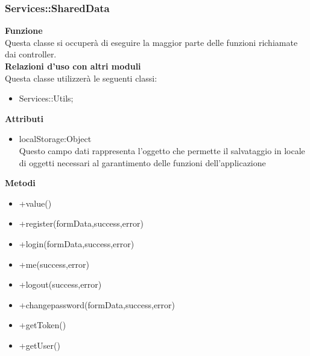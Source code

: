 \subsubsection{Services::SharedData}
		\label{sub:servicesMain}
		\textbf{Funzione}\\
		\indent Questa classe si occuperà di eseguire la maggior parte delle funzioni richiamate dai controller.\\
		\textbf{Relazioni d'uso con altri moduli}\\
		\indent Questa classe utilizzerà le seguenti classi:
		\begin{itemize}
		\item Services::Utils;
		\end{itemize}
		\textbf{Attributi}\\
		\begin{itemize}
		\item localStorage:Object\\
		Questo campo dati rappresenta l’oggetto che permette il salvataggio in locale di oggetti necessari al garantimento delle funzioni dell'applicazione
		\end{itemize}
		\textbf{Metodi}
		\begin{itemize}
		\item +value()
		\item +register(formData,success,error)
		\item +login(formData,success,error)
		\item +me(success,error)
		\item +logout(success,error)
		\item +changepassword(formData,success,error)
		\item +getToken()
		\item +getUser()

		\end{itemize} 

